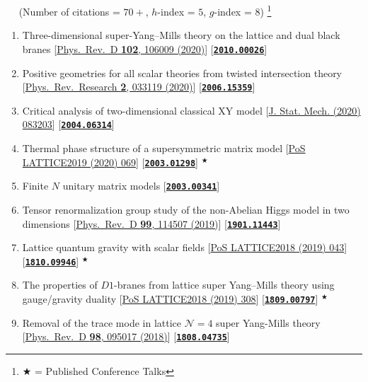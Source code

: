~~ (Number of citations = $70+$, $h$-index = $5$, $g$-index = $8$) 
\footnote{$\bigstar$ = Published Conference Talks}
 \begin{enumerate}
 \item Three-dimensional super-Yang--Mills theory on the lattice and dual black branes [\href{https://journals.aps.org/prd/abstract/10.1103/PhysRevD.102.106009}{Phys.\ Rev.\ D {\bf 102}, 106009 (2020)}] [\textbf{\texttt{\textcolor{blue}{\href{https://arxiv.org/abs/2010.00026}{2010.00026}}}}] 
 \item Positive geometries for all scalar theories from twisted intersection theory [\href{https://journals.aps.org/prresearch/abstract/10.1103/PhysRevResearch.2.033119}{Phys.\ Rev.\ Research {\bf 2}, 033119 (2020)}] [\texttt{\textbf{\textcolor{blue}{\href{https://arxiv.org/abs/2006.15359}{2006.15359}}}}] 
  \item Critical analysis of two-dimensional classical XY model [\href{https://iopscience.iop.org/article/10.1088/1742-5468/aba686/pdf}{J. Stat. Mech. (2020) 083203}] [\texttt{\textbf{\textcolor{blue}{\href{https://arxiv.org/abs/2004.06314}{2004.06314}}}}] 
 \item Thermal phase structure of a supersymmetric matrix model [\href{https://pos.sissa.it/363/069}{PoS LATTICE2019 (2020) 069}] [\texttt{\textbf{\textcolor{blue}{\href{https://arxiv.org/abs/2003.01298}{2003.01298}}}}] $^{\bigstar}$
 \item  Finite $N$ unitary matrix models [\textbf{\texttt{\textcolor{blue}{\href{https://arxiv.org/abs/2003.00341}{2003.00341}}}}] 
  \item Tensor renormalization group study of the non-Abelian Higgs model in two dimensions [\href{https://journals.aps.org/prd/abstract/10.1103/PhysRevD.99.114507}{Phys.\ Rev.\ D {\bf 99}, 114507 (2019)}] [\texttt{\textbf{\textcolor{blue}{\href{https://arxiv.org/abs/1901.11443}{1901.11443}}}}] 
 \item  Lattice quantum gravity with scalar fields [\href{https://pos.sissa.it/334/043}{PoS LATTICE2018 (2019) 043}] [\texttt{\textbf{\textcolor{blue}{\href{https://arxiv.org/abs/1810.09946}{1810.09946}}}}] $^{\bigstar}$
  \item  The properties of $D1$-branes from lattice super Yang--Mills theory using gauge/gravity duality [\href{https://pos.sissa.it/334/308}{PoS LATTICE2018 (2019) 308}]   [\texttt{\textbf{\textcolor{blue}{\href{https://arxiv.org/abs/1809.00797}{1809.00797}}}}] $^{\bigstar}$
  \item  Removal of the trace mode in lattice $\mathcal{N }= 4$ super Yang-Mills theory [\href{https://journals.aps.org/prd/abstract/10.1103/PhysRevD.98.095017}{Phys.\ Rev.\ D {\bf 98}, 095017 (2018)}] [\texttt{\textbf{\texttt{\textcolor{blue}{\href{https://arxiv.org/abs/1808.04735}{1808.04735}}}}}]  

\end{enumerate}
